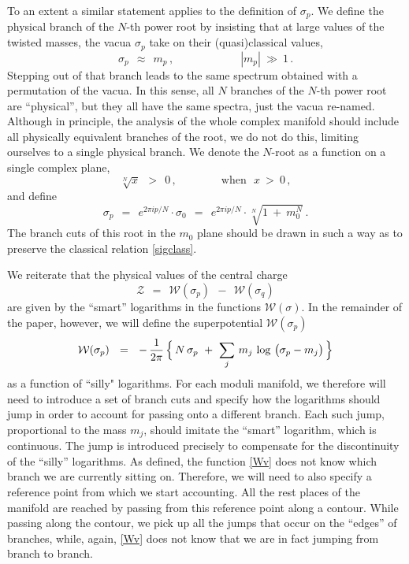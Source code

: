 \documentclass[epsfig,12pt]{article}
\def\beq{\begin{equation}}
\def\eeq{\end{equation}}
\def\beq{\begin{equation}}
\def\eeq{\end{equation}}
\newcommand{\mc}[1]{\mathcal{#1}}
\newcommand{\W}{\mathcal{W}}
\begin{document}
	To an extent a similar statement applies to the definition of $ \sigma_p $.
	We define the physical branch of the $ N $-th power root by insisting that
	at large values of the twisted masses, the vacua $ \sigma_p $ take on their (quasi)classical values,
\beq
\label{sigclass}
	\sigma_p  ~~\approx~~ m_p\,,  \qquad\qquad\qquad |m_p| ~\gg~ 1\,.
\eeq
	Stepping out of that branch leads to the same spectrum obtained with a permutation of the vacua.
	In this sense, all $ N $ branches of the $ N $-th power root are ``physical'', but they all have the
	same spectra, just the vacua re-named.
	Although in principle, the analysis of the whole complex manifold should include 
	all physically equivalent branches of the root, we do not do this, 
	limiting ourselves to a single physical branch.
	We denote the $ N $-root as a function on a single complex plane,  
\beq
	\sqrt[N]{x} ~~>~~ 0\,, \qquad\qquad \text{when~~} x ~>~ 0\,,
\eeq
	and define
\beq
	\sigma_p ~~=~~ e^{2 \pi i p / N} \cdot \sigma_0 ~~=~~ e^{2 \pi i p / N} \cdot \sqrt[N]{ 1 ~+~ m_0^N }\,.
\eeq
	The branch cuts of this root in the $ m_0 $ plane should be drawn in such a way as to preserve
	the classical relation \eqref{sigclass}.
	

	We reiterate that the physical values of the central charge 
\beq
\label{ccharge}
	\mc{Z} ~~=~~ \W(\sigma_p) ~~-~~ \W(\sigma_q)
\eeq
	are given by the ``smart'' logarithms in the functions $ \W(\sigma) $.
	In the remainder  of the paper, however, we will define the superpotential $ \W(\sigma_p) $
\beq
\label{Wv}
	\W ( \sigma_p ) ~~=~~ 
		-\, \frac{1}{2\pi}\,  
                \Bigl\{\, N\, \sigma_p ~+~ \sum_j\, m_j\, \log\, \big( \sigma_p - m_j \big) \,\Bigr\}
\eeq
	as a function of ``silly" logarithms. 
	For each moduli manifold, we therefore will need to introduce a set of branch cuts and 
	specify how the logarithms should jump in order to account for passing onto a different branch.
	Each such jump, proportional to the mass $ m_j $, should imitate the ``smart'' logarithm,
	which is continuous.
	The jump is introduced precisely to compensate for the discontinuity of the ``silly'' logarithms.
	As defined, the function \eqref{Wv} does not know which branch we are currently sitting on.
	Therefore, we will need to also specify a reference point from which we start accounting.
	All the rest places of the manifold are reached by passing from this reference point along a contour.
	While passing along the contour, we pick up all the jumps that occur on the ``edges'' of 
	branches, while, again, \eqref{Wv} does not know that we are in fact jumping from
	branch to branch.
\end{document}
